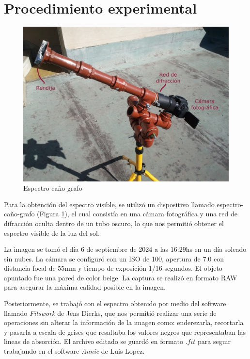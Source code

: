 \documentclass[11pt, a4paper]{article}
\begin{document}
\section{Procedimiento experimental}
\begin{figure}
    \centering
    \includegraphics[width=.98 \linewidth]{images/Screenshot_2024-10-15-17-15-57-031_com.google.android.apps.docs~2.jpg}
    \caption{Espectro-caño-grafo}
    \label{espectrografo}
\end{figure}
Para la obtención del espectro visible, se utilizó un dispositivo llamado espectro-caño-grafo (Figura \ref{espectrografo}), el cual consistía en una cámara fotográfica y una red de difracción oculta dentro de un tubo oscuro, lo que nos permitió obtener el espectro visible de la luz del sol.


La imagen se tomó el día 6 de septiembre de 2024 a las 16:29hs en un día soleado sin nubes. La cámara se configuró con un ISO de 100, apertura de 7.0 con distancia focal de 55mm y tiempo de exposición 1/16 segundos. 
El objeto apuntado fue una pared de color beige.
La captura se realizó en formato RAW para asegurar la máxima calidad posible en la imagen.

Posteriormente, se trabajó con el espectro obtenido por medio del software llamado \textit{Fitswork} de Jens Dierks, que nos permitió realizar una serie de operaciones sin alterar la información de la imagen como: enderezarla, recortarla y pasarla a escala de grises que resaltaba los valores negros que representaban las lineas de absorción. El archivo editado se guardó en formato $.fit$ para seguir trabajando en el software \textit{Annie} de Luis Lopez. 
\end{document}
